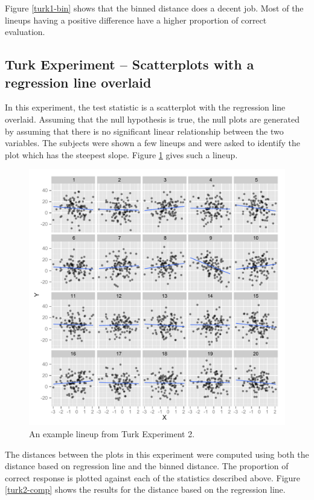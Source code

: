 \documentclass[12]{article}
\begin{document}
Figure \ref{turk1-bin} shows that the binned distance does a decent job. Most of the lineups having a positive difference have a higher proportion of correct evaluation.  

\subsection{Turk Experiment -- Scatterplots with a regression line overlaid}

In this experiment, the test statistic is a scatterplot with the regression line overlaid. Assuming that the null hypothesis is true, the null plots are generated by assuming that there is no significant linear relationship between the two variables. The subjects were shown a few lineups and were asked to identify the plot which has the steepest slope. Figure \ref{turk2} gives such a lineup. 

\begin{figure}[htbp]
\centering
\includegraphics[width=.5\textwidth]{turk2-example.pdf}
\caption{An example lineup from Turk Experiment 2.}
\label{turk2}
\end{figure}

The distances between the plots in this experiment were computed using both the distance based on regression line and the binned distance. The proportion of correct response is plotted against each of the statistics described above. Figure \ref{turk2-comp} shows the results for the distance based on the regression line.
\end{document}
